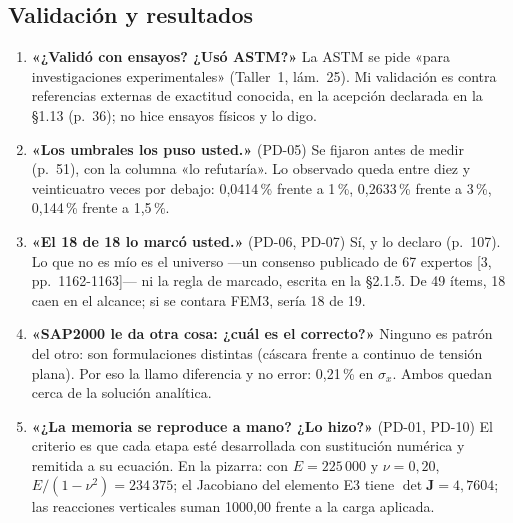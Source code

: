 \documentclass[11pt,a4paper]{article}
\begin{document}
\subsection{Validación y resultados}
\begin{enumerate}[resume*=preg]
\item \textbf{«¿Validó con ensayos? ¿Usó ASTM?»} La ASTM se pide «para investigaciones experimentales» (Taller~1, lám.~25). Mi validación es contra referencias externas de exactitud conocida, en la acepción declarada en la §1.13 (p.~36); no hice ensayos físicos y lo digo.
\item \textbf{«Los umbrales los puso usted.»} (PD-05) Se fijaron antes de medir (p.~51), con la columna «lo refutaría». Lo observado queda entre diez y veinticuatro veces por debajo: 0,0414\,\% frente a 1\,\%, 0,2633\,\% frente a 3\,\%, 0,144\,\% frente a 1,5\,\%.
\item \textbf{«El 18 de 18 lo marcó usted.»} (PD-06, PD-07) Sí, y lo declaro (p.~107). Lo que no es mío es el universo ---un consenso publicado de 67 expertos [3, pp.~1162-1163]--- ni la regla de marcado, escrita en la §2.1.5. De 49 ítems, 18 caen en el alcance; si se contara FEM3, sería 18 de 19.
\item \textbf{«SAP2000 le da otra cosa: ¿cuál es el correcto?»} Ninguno es patrón del otro: son formulaciones distintas (cáscara frente a continuo de tensión plana). Por eso la llamo diferencia y no error: 0,21\,\% en $\sigma_x$. Ambos quedan cerca de la solución analítica.
\item \textbf{«¿La memoria se reproduce a mano? ¿Lo hizo?»} (PD-01, PD-10) El criterio es que cada etapa esté desarrollada con sustitución numérica y remitida a su ecuación. En la pizarra: con $E=225\,000$ y $\nu=0{,}20$, $E/(1-\nu^2)=234\,375$; el Jacobiano del elemento E3 tiene $\det\mathbf{J}=4{,}7604$; las reacciones verticales suman 1000,00 frente a la carga aplicada.
\end{enumerate}
\end{document}
